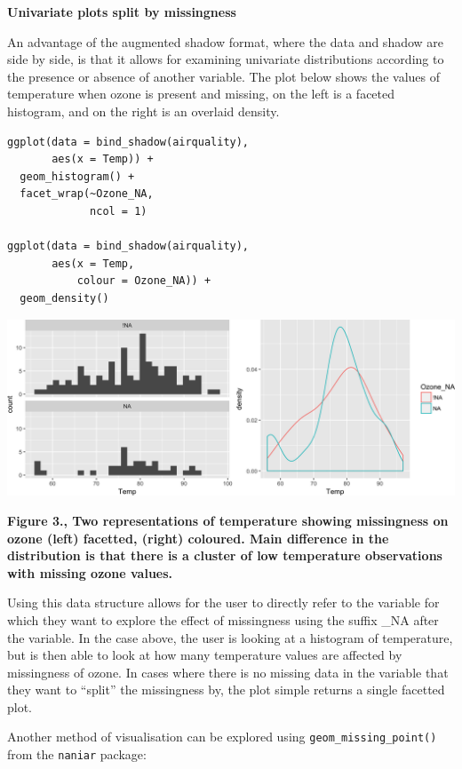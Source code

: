 \documentclass[]{article}
\begin{document}
\textbf{Univariate plots split by missingness}

An advantage of the augmented shadow format, where the data and shadow
are side by side, is that it allows for examining univariate
distributions according to the presence or absence of another variable.
The plot below shows the values of temperature when ozone is present and
missing, on the left is a faceted histogram, and on the right is an
overlaid density.

\begin{verbatim}
ggplot(data = bind_shadow(airquality),
       aes(x = Temp)) + 
  geom_histogram() + 
  facet_wrap(~Ozone_NA,
             ncol = 1)

ggplot(data = bind_shadow(airquality),
       aes(x = Temp,
           colour = Ozone_NA)) + 
  geom_density()
\end{verbatim}

\includegraphics{jsm2017_njtierney_files/figure-latex/bind-shadow-density-1.png}

\textbf{Figure 3., Two representations of temperature showing
missingness on ozone (left) facetted, (right) coloured. Main difference
in the distribution is that there is a cluster of low temperature
observations with missing ozone values.}

Using this data structure allows for the user to directly refer to the
variable for which they want to explore the effect of missingness using
the suffix \_NA after the variable. In the case above, the user is
looking at a histogram of temperature, but is then able to look at how
many temperature values are affected by missingness of ozone. In cases
where there is no missing data in the variable that they want to
``split'' the missingness by, the plot simple returns a single facetted
plot.

Another method of visualisation can be explored using
\texttt{geom\_missing\_point()} from the \texttt{naniar} package:
\end{document}
